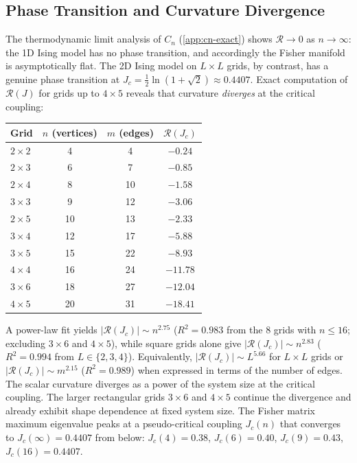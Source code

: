 \documentclass[11pt]{article}
\theoremstyle{definition}
\theoremstyle{remark}
\newcommand{\Scal}{\mathcal{R}}
\begin{document}
\subsection{Phase Transition and Curvature Divergence}
\label{subsec:phase-transition}

The thermodynamic limit analysis of $C_n$ (\cref{app:cn-exact}) shows
$\Scal \to 0$ as $n \to \infty$: the 1D Ising model has no phase
transition, and accordingly the Fisher manifold is asymptotically flat.
The 2D Ising model on $L \times L$ grids, by contrast, has a genuine
phase transition at $J_c = \frac{1}{2}\ln(1 + \sqrt{2}) \approx 0.4407$.
Exact computation of $\Scal(J)$ for grids up to $4 \times 5$ reveals
that curvature \emph{diverges} at the critical coupling:

\begin{center}
\renewcommand{\arraystretch}{1.2}
\begin{tabular}{lccc}
\toprule
Grid & $n$ (vertices) & $m$ (edges) & $\Scal(J_c)$ \\
\midrule
$2 \times 2$ & 4 & 4 & $-0.24$ \\
$2 \times 3$ & 6 & 7 & $-0.85$ \\
$2 \times 4$ & 8 & 10 & $-1.58$ \\
$3 \times 3$ & 9 & 12 & $-3.06$ \\
$2 \times 5$ & 10 & 13 & $-2.33$ \\
$3 \times 4$ & 12 & 17 & $-5.88$ \\
$3 \times 5$ & 15 & 22 & $-8.93$ \\
$4 \times 4$ & 16 & 24 & $-11.78$ \\
$3 \times 6$ & 18 & 27 & $-12.04$ \\
$4 \times 5$ & 20 & 31 & $-18.41$ \\
\bottomrule
\end{tabular}
\end{center}

\noindent
A power-law fit yields $|\Scal(J_c)| \sim n^{2.75}$ ($R^2 = 0.983$
from the $8$ grids with $n \le 16$; excluding $3{\times}6$ and $4{\times}5$),
while square grids alone give
$|\Scal(J_c)| \sim n^{2.83}$ ($R^2 = 0.994$ from $L \in \{2, 3, 4\}$).
Equivalently, $|\Scal(J_c)| \sim L^{5.66}$ for $L \times L$ grids or
$|\Scal(J_c)| \sim m^{2.15}$ ($R^2 = 0.989$) when expressed in terms of the
number of edges.
The scalar curvature diverges as a power of the system size at the
critical coupling.
The larger rectangular grids $3{\times}6$ and $4{\times}5$ continue the
divergence and already exhibit shape dependence at fixed system size.
The Fisher matrix maximum eigenvalue peaks at a pseudo-critical coupling
$J_c(n)$ that converges to $J_c(\infty) = 0.4407$ from below:
$J_c(4) = 0.38$, $J_c(6) = 0.40$, $J_c(9) = 0.43$, $J_c(16) = 0.4407$.
\end{document}

